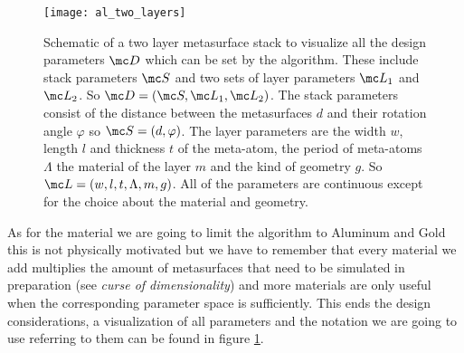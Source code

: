 \begin{figure}[H]
    \centering
    \texttt{[image: al\_two\_layers]}
    \caption{Schematic of a two layer metasurface stack to visualize all the design parameters
    $\mc D$ which can be set by the algorithm. These include stack parameters $\mc S$ and two sets of layer parameters $\mc L_1$ and $\mc L_2$.
    So ${\mc D = (\mc S, \mc L_1, \mc L_2)}$. The stack parameters consist of the distance between the metasurfaces $d$ and their rotation angle $\varphi$ so $\mc S = (d, \varphi)$. The layer parameters are the width $w$, length $l$ and thickness $t$ of the meta-atom, the period of meta-atoms $\Lambda$ the  material of the layer $m$ and the kind of geometry $g$. So $\mc L = (w,l,t,\Lambda,m,g)$. All of the parameters are continuous except for the choice about the material and geometry.}
    \label{fig:al:two_layers}
\end{figure}

As for the material we are going to limit the algorithm to Aluminum and Gold this is not physically motivated but we have to remember that every material we add multiplies the amount of metasurfaces that need to be simulated in preparation (see \textit{curse of dimensionality}) and more materials are only useful when the corresponding parameter space is sufficiently.
This ends the design considerations, a visualization of all parameters and the notation we are going to use referring to them can be found in figure \ref{fig:al:two_layers}.
